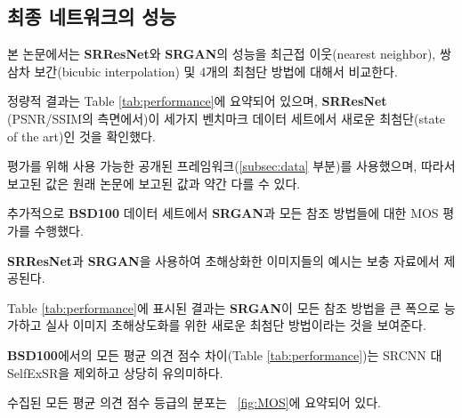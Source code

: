 \documentclass[10pt,twocolumn,letterpaper]{article}
\newcommand{\kor}[1]{#1}
\newcommand{\eng}[1]{}
\begin{document}
\subsection{\eng{Performance of the final networks}\kor{최종 네트워크의 성능}}
\label{subsec:msebased}
\eng{
We compare the performance of \textbf{SRResNet} and \textbf{SRGAN} to NN, bicubic interpolation, and four state-of-the-art methods.
}\kor{
본 논문에서는 \textbf{SRResNet}와 \textbf{SRGAN}의 성능을 최근접 이웃(nearest neighbor), 쌍삼차 보간(bicubic interpolation) 및 4개의 최첨단 방법에 대해서 비교한다.
}
\eng{
Quantitative results are summarized in Table \ref{tab:performance} and confirm that \textbf{SRResNet} (in terms of PSNR/SSIM) sets a new state of the art on three benchmark datasets.
}\kor{
정량적 결과는 Table \ref{tab:performance}에 요약되어 있으며, \textbf{SRResNet} (PSNR/SSIM의 측면에서)이 세가지 벤치마크 데이터 세트에서 새로운 최첨단(state of the art)인 것을 확인했다.
}
\eng{
Please note that we used a publicly available framework for evaluation (\cf Section \ref{subsec:data}), reported values might thus slightly deviate from those reported in the original papers.
}\kor{
평가를 위해 사용 가능한 공개된 프레임워크(\cf \ref{subsec:data} 부분)를 사용했으며, 따라서 보고된 값은 원래 논문에 보고된 값과 약간 다를 수 있다.
}

\eng{
We further obtained \ac{MOS} ratings for \textbf{SRGAN} and all reference methods on \textbf{BSD100}.
}\kor{
추가적으로 \textbf{BSD100} 데이터 세트에서 \textbf{SRGAN}과 모든 참조 방법들에 대한 \ac{MOS} 평가를 수행했다.
} \eng{
Examples of images super-resolved with \textbf{SRResNet} and \textbf{SRGAN} are depicted in the supplementary material.
}\kor{
\textbf{SRResNet}과 \textbf{SRGAN}을 사용하여 초해상화한 이미지들의 예시는 보충 자료에서 제공된다.
}
\eng{
The results shown in Table \ref{tab:performance} confirm that \textbf{SRGAN} outperforms all reference methods by a large margin and sets a new state of the art for photo-realistic image \ac{SR}.
}\kor{
Table \ref{tab:performance}에 표시된 결과는 \textbf{SRGAN}이 모든 참조 방법을 큰 폭으로 능가하고 실사 이미지 초해상도화를 위한 새로운 최첨단 방법이라는 것을 보여준다.
} \eng{
All differences in \ac{MOS} (\cf Table \ref{tab:performance}) are highly significant on \textbf{BSD100}, except SRCNN vs. SelfExSR.
}\kor{
\textbf{BSD100}에서의 모든 \ac{평균 의견 점수} 차이(\cf Table \ref{tab:performance})는 SRCNN 대 SelfExSR을 제외하고 상당히 유의미하다.
} \eng{
The distribution of all collected \ac{MOS} ratings is summarized in \figurename~\ref{fig:MOS}.
}\kor{
수집된 모든 \ac{평균 의견 점수} 등급의 분포는 \figurename~\ref{fig:MOS}에 요약되어 있다.
}
\end{document}
